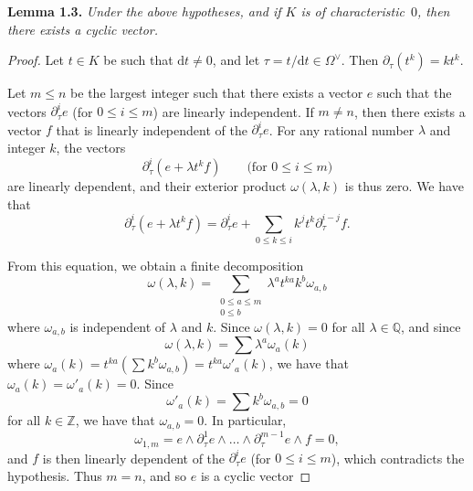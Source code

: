 \documentclass{report}
\newenvironment{itenv}[1]
  {\phantomsection\par\medskip\noindent\textbf{#1.}\itshape}
  {\medskip}
\newcommand{\QQ}{\mathbb{Q}}
\newcommand{\ZZ}{\mathbb{Z}}
\newcommand{\dd}{\mathrm{d}}
\renewcommand{\leq}{\leqslant}
\newcommand{\oldpage}[1]{\marginpar{\footnotesize$\Big\vert$ \textit{p.~#1}}}
\begin{document}
\begin{itenv}{Lemma 1.3}
\label{II.1.3}
  Under the above hypotheses, and if $K$ is of characteristic~$0$, then there exists a cyclic vector.
\end{itenv}

\begin{proof}
  Let $t\in K$ be such that $\dd t\neq0$, and let $\tau=t/\dd t\in\Omega^\vee$.
  Then $\partial_\tau(t^k)=kt^k$.

  Let $m\leq n$ be the largest integer such that there exists a vector $e$ such that the vectors $\partial_\tau^i e$ (for $0\leq i\leq m$) are linearly independent.
  If $m\neq n$, then there exists a vector $f$ that is linearly independent of the $\partial_\tau^i e$.
  For any rational number $\lambda$ and integer $k$, the vectors
  \[
    \partial_\tau^i(e+\lambda t^k f)
    \qquad\mbox{(for $0\leq i\leq m$)}
  \]
  are linearly dependent, and their exterior product $\omega(\lambda,k)$ is thus zero.
  We have that
  \[
    \partial_\tau^i(e+\lambda t^k f)
    = \partial_\tau^i e + \sum_{0\leq k\leq i} k^j t^k \partial_\tau^{i-j} f.
  \]

  From this equation, we obtain a finite decomposition
  \[
    \omega(\lambda,k)
    = \sum_{\substack{0\leq a\leq m\\0\leq b}} \lambda^a t^{ka} k^b \omega_{a,b}
  \]
\oldpage{43}
  where $\omega_{a,b}$ is independent of $\lambda$ and $k$.
  Since $\omega(\lambda,k)=0$ for all $\lambda\in\QQ$, and since
  \[
    \omega(\lambda,k) = \sum \lambda^a \omega_a(k)
  \]
  where $\omega_a(k) = t^{ka}(\sum k^b \omega_{a,b}) = t^{ka} \omega'_a(k)$, we have that $\omega_a(k) = \omega'_a(k) = 0$.
  Since
  \[
    \omega'_a(k) = \sum k^b \omega_{a,b} = 0
  \]
  for all $k\in\ZZ$, we have that $\omega_{a,b}=0$.
  In particular,
  \[
    \omega_{1,m}
    = e\wedge\partial_\tau^1 e\wedge\ldots\wedge\partial_\tau^{m-1} e\wedge f
    = 0,
  \]
  and $f$ is then linearly dependent of the $\partial_\tau^i e$ (for $0\leq i\leq m$), which contradicts the hypothesis.
  Thus $m=n$, and so $e$ is a cyclic vector
\end{proof}
\end{document}

